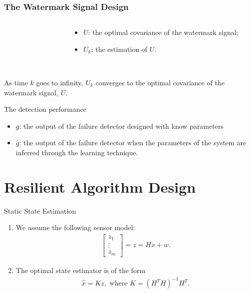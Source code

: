 \documentclass[10pt]{beamer}
\newcommand{\tikzdir}[1]{#1.tikz}
\newcommand{\inputtikz}[1]{}}
\begin{document}
\begin{frame}
  \frametitle{The Watermark Signal Design}
  \begin{columns}
    \begin{column}{0.6\textwidth}
      \begin{figure}[h!]
        \inputtikz{errU1_te}
      \end{figure}
    \end{column}
    \begin{column}{0.4\textwidth}
      \begin{itemize}
      \item $U$: the optimal covariance of the watermark signal;
      \item $U_k$: the estimation of $U$.
      \end{itemize}
    \end{column}
  \end{columns}
 ~\\
  As time $k$ goes to infinity, $U_k$ converges to the optimal covariance of the watermark signal, $U$.
\end{frame}

\begin{frame}{The detection performance}
  \begin{itemize}
  \item $g$: the output of the failure detector designed with know parameters
  \item $\hat g$: the output of the failure detector when the parameters of the system are inferred through the learning technique. 
  \end{itemize}
  \begin{figure}[h!]
    \centering
    \inputtikz{gng_te}
  \end{figure}
\end{frame}

\section{Resilient Algorithm Design}

\begin{frame}{Static State Estimation}
  \begin{enumerate}
  \item We assume the following sensor model:
    \begin{align*}
  \begin{bmatrix}z_1\\\vdots\\z_m\end{bmatrix} =  z = Hx + w.
    \end{align*}
  \item The optimal state estimator is of the form
    \begin{align*}
      \hat x = Kz, \text{ where }K = (H^TH)^{-1}H^T.
    \end{align*}
  \end{enumerate}
\end{frame}
\end{document}
